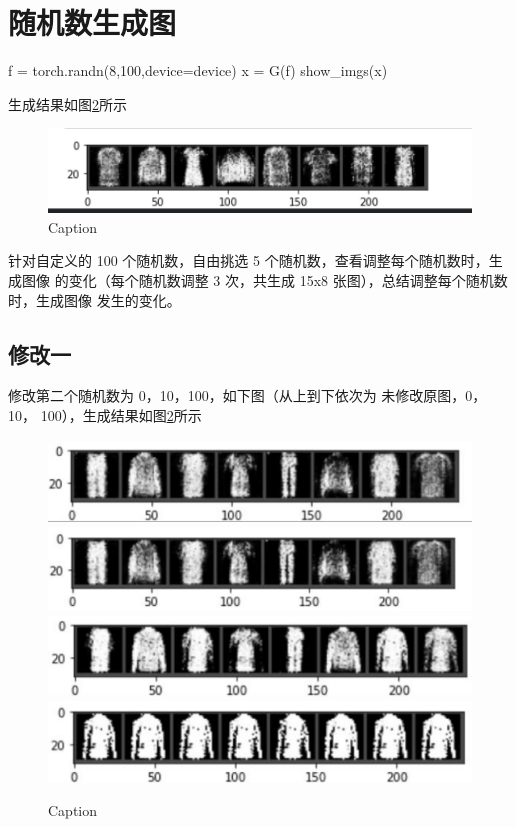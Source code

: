 \documentclass[UTF8,a4paper,10pt]{ctexart}
\begin{document}
\section{随机数生成图}

\begin{python}
    f = torch.randn(8,100,device=device)
    x = G(f)
    show_imgs(x)

\end{python}

生成结果如图\ref{fig:1}所示
\begin{figure}[H]
    \centering
    \includegraphics[scale=0.5]{3.png}
    \caption{Caption}
    \label{fig:1}
\end{figure}


针对自定义的 100 个随机数，自由挑选 5 个随机数，查看调整每个随机数时，生成图像
的变化（每个随机数调整 3 次，共生成 15x8 张图），总结调整每个随机数时，生成图像
发生的变化。





\subsection{修改一}

修改第二个随机数为 0，10，100，如下图（从上到下依次为 未修改原图，0，10，
100），生成结果如图\ref{fig:1}所示
\begin{figure}[H]
    \centering
    \includegraphics[scale=0.5]{4.png}
    \includegraphics[scale=0.5]{5.png}
    \includegraphics[scale=0.5]{6.png}
    \includegraphics[scale=0.5]{7.png}
    \caption{Caption}
    \label{fig:1}
\end{figure}
\end{document}
